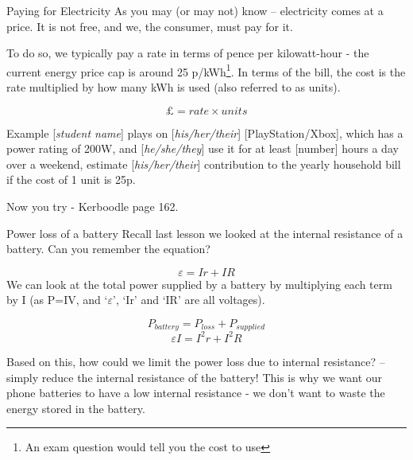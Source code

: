 \documentclass[../Main.tex]{subfiles}
\begin{document}
\begin{frame}{Paying for Electricity}
    As you may (or may not) know -- electricity comes at a price. It is not free, and we, the consumer, must pay for it. \newline
    
    To do so, we typically pay a rate in terms of pence per kilowatt-hour - the current energy price cap is around 25 p/kWh\footnote{An exam question would tell you the cost to use}. In terms of the bill, the cost is the rate multiplied by how many kWh is used (also referred to as units).
    
    \begin{equation*}
            \mathsterling = rate \times units
    \end{equation*}
    
    \begin{exampleblock}{Example}
     [\emph{student name}] plays on [\emph{his/her/their}] [PlayStation/Xbox], which has a power rating of 200W, and [\emph{he/she/they}] use it for at least [number] hours a day over a weekend, estimate [\emph{his/her/their}] contribution to the yearly household bill if the cost of 1 unit is 25p.
    \end{exampleblock}
    \pause
    Now you try - Kerboodle page 162.
\end{frame}

\begin{frame}{Power loss of a battery}
    Recall last lesson we looked at the internal resistance of a battery. Can you remember the equation? \pause
    
    \begin{equation*}
        \varepsilon = Ir + IR
    \end{equation*}
    \pause
    We can look at the total power supplied by a battery by multiplying each term by I (as P=IV, and `$\varepsilon$', `Ir' and `IR' are all voltages). 
    
    \begin{equation*}
        P_{battery} = P_{loss} + P_{supplied}
    \end{equation*}
    \begin{equation*}
        \varepsilon I = I^2r + I^2 R
    \end{equation*}
    
    Based on this, how could we limit the power loss due to internal resistance? \pause 
    -- simply reduce the internal resistance of the battery! This is why we want our phone batteries to have a low internal resistance - we don't want to waste the energy stored in the battery.
\end{frame}
\end{document}
